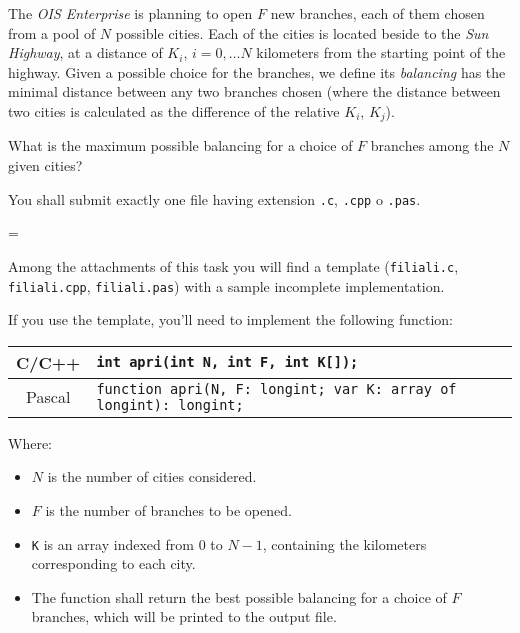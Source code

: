 \usepackage{xcolor}
\usepackage{afterpage}
\usepackage{pifont,mdframed}
\usepackage[bottom]{footmisc}

\makeatletter
\gdef\this@inputfilename{input.txt}
\gdef\this@outputfilename{output.txt}
\makeatother

\newcommand{\inputfile}{\texttt{input.txt}}
\newcommand{\outputfile}{\texttt{output.txt}}

\newenvironment{warning}
  {\par\begin{mdframed}[linewidth=2pt,linecolor=gray]%
    \begin{list}{}{\leftmargin=1cm
                   \labelwidth=\leftmargin}\item[\Large\ding{43}]}
  {\end{list}\end{mdframed}\par}

	The \emph{OIS Enterprise} is planning to open $F$ new branches, each of them chosen from a pool of $N$ possible cities. Each of the cities is located beside to the \emph{Sun Highway}, at a distance of $K_i$, $i=0,\ldots N$ kilometers from the starting point of the highway. Given a possible choice for the branches, we define its \emph{balancing} has the minimal distance between any two branches chosen (where the distance between two cities is calculated as the difference of the relative $K_i$, $K_j$).

	What is the maximum possible balancing for a choice of $F$ branches among the $N$ given cities?

\Implementation
You shall submit exactly one file having extension \texttt{.c}, \texttt{.cpp} o \texttt{.pas}.

\begin{warning}
Among the attachments of this task you will find a template (\texttt{filiali.c}, \texttt{filiali.cpp}, \texttt{filiali.pas}) with a sample incomplete implementation.
\end{warning}

If you use the template, you'll need to implement the following function:
\begin{center}\begin{tabularx}{\textwidth}{|c|X|}
\hline
C/C++  & \verb|int apri(int N, int F, int K[]);|\\
\hline
Pascal & \verb|function apri(N, F: longint; var K: array of longint): longint;|\\
\hline
\end{tabularx}\end{center}
Where:
\begin{itemize}[nolistsep]
  \item $N$ is the number of cities considered.
  \item $F$ is the number of branches to be opened.
  \item \texttt{K} is an array indexed from $0$ to $N-1$, containing the kilometers corresponding to each city.
  \item The function shall return the best possible balancing for a choice of $F$ branches, which will be printed to the output file.
\end{itemize}

